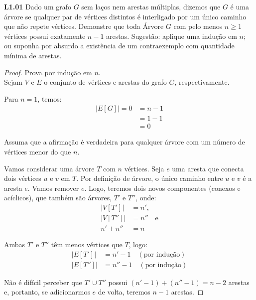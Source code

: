 
\noindent \textbf{L1.01} Dado um grafo $G$ sem laços nem arestas múltiplas, dizemos que $G$ é uma árvore se qualquer par de vértices distintos é interligado por um único caminho que não repete vértices. Demonstre que toda Árvore $G$ com pelo menos $n \geq 1$ vértices possui exatamente $n - 1$ arestas. Sugestão: aplique uma indução em $n$; ou suponha por absurdo a existência de um contraexemplo com quantidade mínima de arestas.

\begin{proof}
Prova por indução em $n$.\\

Sejam $V$ e $E$ o conjunto de vértices e arestas do grafo $G$, respectivamente.

\indbase Para $n = 1$, temos:
\begin{align*}
|E[G]| = 0 &= n - 1 \\
      &= 1 - 1 \\
      &= 0
\end{align*}

\indhipo Assuma que a afirmação é verdadeira para qualquer árvore com um número de vértices menor do que $n$.

\indstep Vamos considerar uma árvore $T$ com $n$ vértices. Seja $e$ uma aresta que conecta dois vértices $u$ e $v$ em $T$. Por definição de árvore, o único caminho entre $u$ e $v$ é a aresta $e$. Vamos remover $e$. Logo, teremos dois novos componentes (conexos e acíclicos), que também são árvores, $T'$ e $T''$, onde:
\begin{align*}
|V[T']|  &= n'  \text{,}\\
|V[T'']| &= n'' \quad \text{e} \\
n' + n'' &= n
\end{align*}

Ambas $T'$ e $T''$ têm menos vértices que $T$, logo:
\begin{align*}
|E[T']|  &= n' - 1   \quad (\text{por indução}) \\
|E[T'']| &= n'' - 1 \quad (\text{por indução})
\end{align*}

Não é difícil perceber que $T' \cup T''$ possui $(n' - 1) + (n'' - 1) = n -2$ arestas e, portanto, se adicionarmos $e$ de volta, teremos $n - 1$ arestas.

\end{proof}